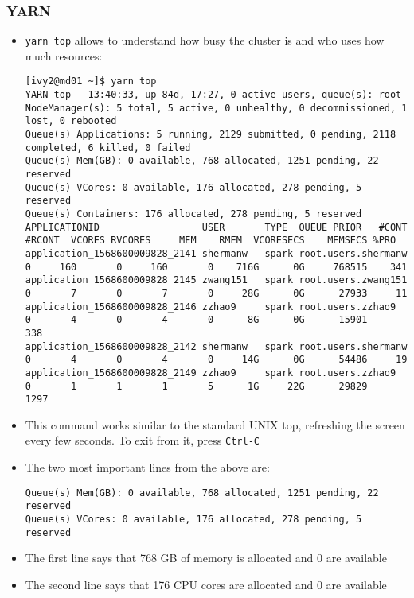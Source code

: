 \documentclass{beamer}
\begin{document}
\begin{frame}[fragile]
  \frametitle{YARN}
  \begin{itemize}
  \item {\color{mycolorcli}\verb|yarn top|} allows to understand how busy the cluster is and who uses how much resources:
    {\fontsize{4}{6}
      {\color{mycolorcli}
\begin{verbatim}
[ivy2@md01 ~]$ yarn top
YARN top - 13:40:33, up 84d, 17:27, 0 active users, queue(s): root
NodeManager(s): 5 total, 5 active, 0 unhealthy, 0 decommissioned, 1 lost, 0 rebooted
Queue(s) Applications: 5 running, 2129 submitted, 0 pending, 2118 completed, 6 killed, 0 failed
Queue(s) Mem(GB): 0 available, 768 allocated, 1251 pending, 22 reserved
Queue(s) VCores: 0 available, 176 allocated, 278 pending, 5 reserved
Queue(s) Containers: 176 allocated, 278 pending, 5 reserved
APPLICATIONID                  USER       TYPE  QUEUE PRIOR   #CONT  #RCONT  VCORES RVCORES     MEM    RMEM  VCORESECS    MEMSECS %PRO
application_1568600009828_2141 shermanw   spark root.users.shermanw     0     160       0     160       0    716G      0G     768515    341
application_1568600009828_2145 zwang151   spark root.users.zwang151     0       7       0       7       0     28G      0G      27933     11
application_1568600009828_2146 zzhao9     spark root.users.zzhao9       0       4       0       4       0      8G      0G      15901     338
application_1568600009828_2142 shermanw   spark root.users.shermanw     0       4       0       4       0     14G      0G      54486     19
application_1568600009828_2149 zzhao9     spark root.users.zzhao9       0       1       1       1       5      1G     22G      29829     1297
\end{verbatim}        
      }
    }
  \item This command works similar to the standard UNIX {\color{mycolorcli}top}, refreshing the screen every few seconds.
    To exit from it, press {\color{mycolorcli}\verb|Ctrl-C|}
  \item The two most important lines from the above are:
    {\tiny
    {\color{mycolorcli}
\begin{verbatim}
Queue(s) Mem(GB): 0 available, 768 allocated, 1251 pending, 22 reserved
Queue(s) VCores: 0 available, 176 allocated, 278 pending, 5 reserved
\end{verbatim}
    }
    }
  \item The first line says that 768 GB of memory is allocated and 0 are available
  \item The second line says that 176 CPU cores are allocated and 0 are available
  \end{itemize}
\end{frame}
\end{document}
